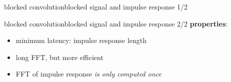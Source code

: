 \begin{frame}{blocked convolution}{blocked signal and impulse response 1/2}
{\begin{figure}
		\end{figure}
		}
		\vspace{50mm}
	\end{frame}

	\begin{frame}{blocked convolution}{blocked signal and impulse response 2/2}
		\textbf{properties}:
		\begin{itemize}
			\item	minimum latency: impulse response length
			\item	long FFT, but more efficient
			\item	FFT of impulse response \textit{is only computed once}
		\end{itemize}
	\end{frame}

